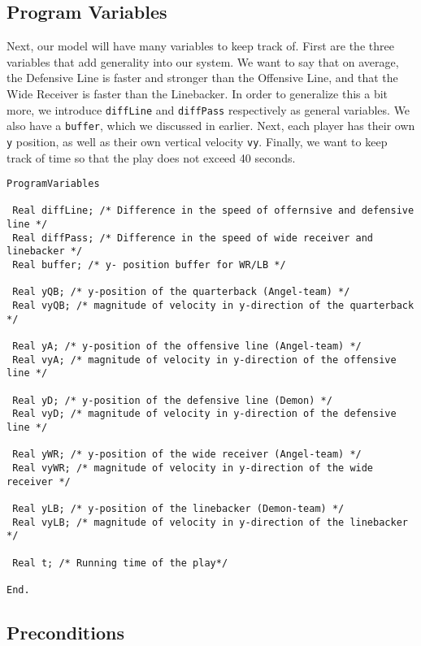 \subsection{Program Variables}

\quad Next, our model will have many variables to keep track of. First are the three variables that add generality into our system. We want to say that on average, the Defensive Line is faster and stronger than the Offensive Line, and that the Wide Receiver is faster than the Linebacker. In order to generalize this a bit more, we introduce \texttt{diffLine} and \texttt{diffPass} respectively as general variables. We also have a \texttt{buffer}, which we discussed in earlier. Next, each player has their own \texttt{y} position, as well as their own vertical velocity \texttt{vy}. Finally, we want to keep track of time so that the play does not exceed 40 seconds.

\begin{lstlisting}
ProgramVariables

 Real diffLine; /* Difference in the speed of offernsive and defensive line */
 Real diffPass; /* Difference in the speed of wide receiver and linebacker */
 Real buffer; /* y- position buffer for WR/LB */

 Real yQB; /* y-position of the quarterback (Angel-team) */
 Real vyQB; /* magnitude of velocity in y-direction of the quarterback */

 Real yA; /* y-position of the offensive line (Angel-team) */
 Real vyA; /* magnitude of velocity in y-direction of the offensive line */

 Real yD; /* y-position of the defensive line (Demon) */
 Real vyD; /* magnitude of velocity in y-direction of the defensive line */

 Real yWR; /* y-position of the wide receiver (Angel-team) */
 Real vyWR; /* magnitude of velocity in y-direction of the wide receiver */

 Real yLB; /* y-position of the linebacker (Demon-team) */
 Real vyLB; /* magnitude of velocity in y-direction of the linebacker */

 Real t; /* Running time of the play*/

End.
\end{lstlisting}

\subsection{Preconditions}

